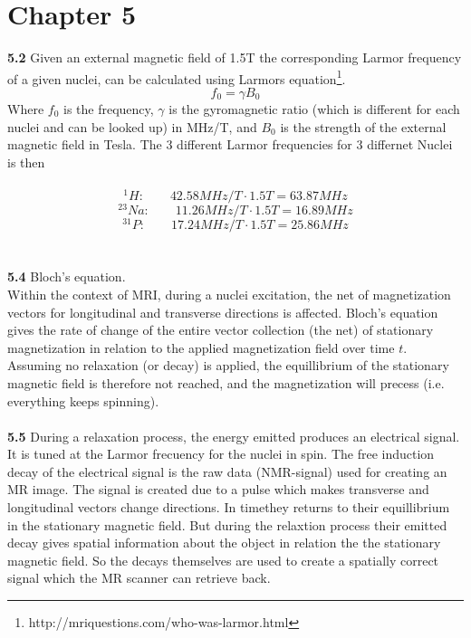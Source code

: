 \documentclass[]{article}
\begin{document}
\section{Chapter 5}
\textbf{5.2} Given an external magnetic field of 1.5T the corresponding Larmor frequency of a given nuclei, can be calculated using Larmors equation\footnote{http://mriquestions.com/who-was-larmor.html}.
\begin{equation}
	f_0 = \gamma B_0
\end{equation}
Where $f_0$ is the frequency, $\gamma$ is the gyromagnetic ratio (which is different for each nuclei and can be looked up) in MHz/T, and $B_0$ is the strength of the external magnetic field in Tesla. The 3 different Larmor frequencies for 3 differnet Nuclei is then\\\\
\begin{equation}
	^1H : \qquad 42.58MHz/T \cdot 1.5T = 63.87 MHz
\end{equation}
\begin{equation}
	^{23}Na : \qquad 11.26MHz/T \cdot 1.5T = 16.89 MHz
\end{equation}
\begin{equation}
	^{31}P : \qquad 17.24MHz/T \cdot 1.5T = 25.86 MHz
\end{equation}\\\\
\textbf{5.4} Bloch's equation.\\
Within the context of MRI, during a nuclei excitation, the net of magnetization vectors for longitudinal and transverse directions is affected. Bloch's equation gives the rate of change of the entire vector collection (the net) of stationary magnetization in relation to the applied magnetization field over time $t$. Assuming no relaxation (or decay) is applied, the equillibrium of the stationary magnetic field is therefore not reached, and the magnetization will precess (i.e. everything keeps spinning).\\\\
\textbf{5.5} During a relaxation process, the energy emitted produces an electrical signal. It is tuned at the Larmor frecuency for the nuclei in spin. The free induction decay of the electrical signal is the raw data (NMR-signal) used for creating an MR image. The signal is created due to a pulse which makes transverse and longitudinal vectors change directions. In timethey returns to their equillibrium in the stationary magnetic field. But during the relaxtion process their emitted decay gives spatial information about the object in relation the the stationary magnetic field. So the decays themselves are used to create a spatially correct signal which the MR scanner can retrieve back.
\end{document}
